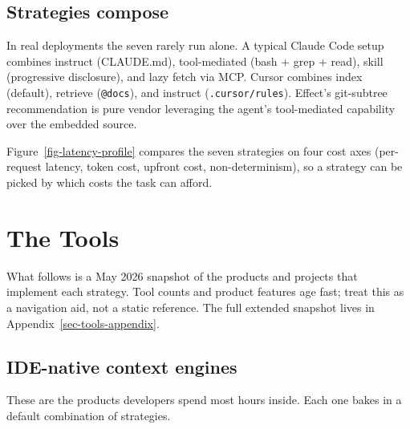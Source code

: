 \documentclass[
  11pt,
  letterpaper,
  numbers=noendperiod,
  parskip=half]{scrartcl}
\begin{document}
\subsection{Strategies compose}\label{sec-strat-compose}

In real deployments the seven rarely run alone. A typical Claude Code
setup combines instruct (CLAUDE.md), tool-mediated (bash + grep +
read), skill (progressive disclosure), and lazy fetch via MCP. Cursor
combines index (default), retrieve (\texttt{@docs}), and instruct
(\texttt{.cursor/rules}). Effect's git-subtree recommendation is pure
vendor leveraging the agent's tool-mediated capability over the
embedded source.

Figure~\ref{fig-latency-profile} compares the seven strategies on four
cost axes (per-request latency, token cost, upfront cost,
non-determinism), so a strategy can be picked by which costs the task
can afford.

\section{The Tools}\label{sec-tools}

What follows is a May 2026 snapshot of the products and projects that
implement each strategy. Tool counts and product features age fast;
treat this as a navigation aid, not a static reference. The full
extended snapshot lives in Appendix~\ref{sec-tools-appendix}.

\subsection{IDE-native context engines}\label{sec-tools-ide}

These are the products developers spend most hours inside. Each one
bakes in a default combination of strategies.
\end{document}
